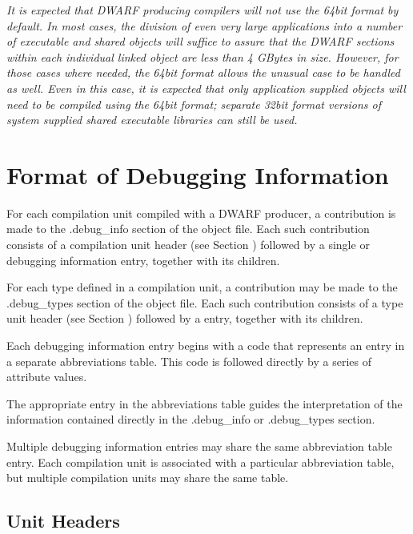 \textit{It is expected that DWARF producing compilers will not use
the 64\dash bit format by default. In most cases, the division of
even very large applications into a number of executable and
shared objects will suffice to assure that the DWARF sections
within each individual linked object are less than 4 GBytes
in size. However, for those cases where needed, the 64\dash bit
format allows the unusual case to be handled as well. Even
in this case, it is expected that only application supplied
objects will need to be compiled using the 64\dash bit format;
separate 32\dash bit format versions of system supplied shared
executable libraries can still be used.}



\section{Format of Debugging Information}
\label{datarep:formatofdebugginginformation}

For each compilation unit compiled with a DWARF producer,
a contribution is made to the .debug\_info section of
the object file. Each such contribution consists of a
compilation unit header 
(see Section ) 
followed by a
single  or  debugging
information entry, together with its children.

For each type defined in a compilation unit, a contribution may
be made to the .debug\_types section of the object file. Each
such contribution consists of a type unit header 
(see Section ) 
followed by a  entry, together with
its children.

Each debugging information entry begins with a code that
represents an entry in a separate abbreviations table. This
code is followed directly by a series of attribute values.

The appropriate entry in the abbreviations table guides the
interpretation of the information contained directly in the
.debug\_info or .debug\_types section.

Multiple debugging information entries may share the same
abbreviation table entry. Each compilation unit is associated
with a particular abbreviation table, but multiple compilation
units may share the same table.
\subsection{Unit Headers}
\label{datarep:unitheaders}

